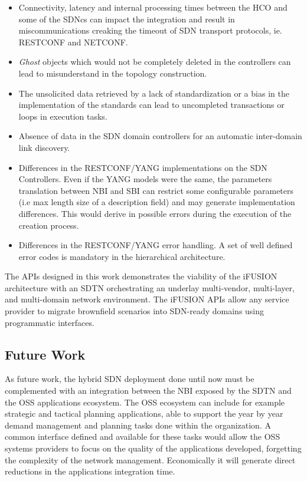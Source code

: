 \documentclass[10pt, conference]{IEEEtran}
\begin{document}
\begin{itemize}
    \item Connectivity, latency and internal processing times between the HCO and some of the SDNcs can impact the integration and result in miscommunications creaking the timeout of SDN transport protocols, ie. RESTCONF and NETCONF.   
    \item \textit{Ghost} objects which would not be completely deleted in the controllers can lead to misunderstand in the topology construction.
    \item The unsolicited data retrieved by a lack of standardization or a bias in the implementation of the standards can lead to uncompleted transactions or loops in execution tasks.
    \item Absence of data in the SDN domain controllers for an automatic inter-domain link discovery.
    \item Differences in the RESTCONF/YANG implementations on the SDN Controllers. Even if the YANG models were the same, the parameters translation between NBI and SBI can restrict some configurable parameters (i.e max length size of a description field) and may generate implementation differences. This would derive in possible errors during the execution of the creation process.
    \item Differences in the RESTCONF/YANG error handling. A set of well defined error codes is mandatory in the hierarchical architecture.
\end{itemize}


The APIs designed in this work demonstrates the viability of the i\uppercase{FUSION} architecture with an SDTN orchestrating an underlay multi-vendor, multi-layer, and multi-domain network environment. The i\uppercase{FUSION} APIs allow any service provider to migrate brownfield scenarios into SDN-ready domains using programmatic interfaces.

\subsection{Future Work}
As future work, the hybrid SDN deployment done until now must be complemented with an integration between the NBI exposed by the SDTN and the OSS applications ecosystem. The OSS ecosystem can include for example strategic and tactical planning applications, able to support the year by year demand management and planning tasks done within the organization. A common interface defined and available for these tasks would allow the OSS systems providers to focus on the quality of the applications developed, forgetting the complexity of the network management. Economically it will generate direct reductions in the applications integration time.
\end{document}
